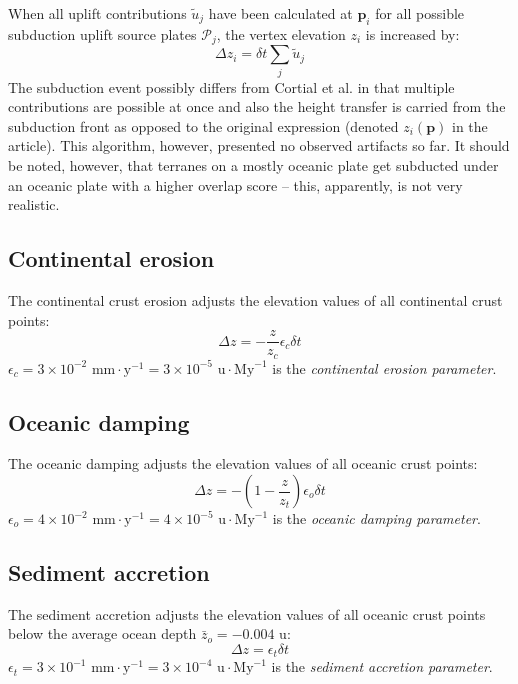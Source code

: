 When all uplift contributions $\tilde{u}_j$ have been calculated at $\mathbf{p}_i$ for all possible subduction uplift source plates $\mathcal{P}_j$, the vertex elevation $z_i$ is increased by:
$$\Delta z_i=\delta t\sum_j \tilde{u}_j$$
The subduction event possibly differs from Cortial et al. in that multiple contributions are possible at once and also the height transfer is carried from the subduction front as opposed to the original expression (denoted $z_i(\mathbf{p})$ in the article). This algorithm, however, presented no observed artifacts so far. It should be noted, however, that terranes on a mostly oceanic plate get subducted under an oceanic plate with a higher overlap score -- this, apparently, is not very realistic.
\subsection{Continental erosion}
The continental crust erosion adjusts the elevation values of all continental crust points:
$$\Delta z = -\frac{z}{z_c}\epsilon_c\delta t$$
$\epsilon_c=3\times10^{-2}\mbox{ mm}\cdot\mbox{y}^{-1}=3\times10^{-5}\mbox{ u}\cdot\mbox{My}^{-1}$ is the \textit{continental erosion parameter}.
\subsection{Oceanic damping}
The oceanic damping adjusts the elevation values of all oceanic crust points:
$$\Delta z = -\left(1-\frac{z}{z_t}\right)\epsilon_o\delta t$$
$\epsilon_o=4\times10^{-2}\mbox{ mm}\cdot\mbox{y}^{-1}=4\times10^{-5}\mbox{ u}\cdot\mbox{My}^{-1}$ is the \textit{oceanic damping parameter}.
\subsection{Sediment accretion}
The sediment accretion adjusts the elevation values of all oceanic crust points below the average ocean depth $\bar{z}_{o}=-0.004\mbox { u}$:
$$\Delta z = \epsilon_t\delta t$$
$\epsilon_t=3\times10^{-1}\mbox{ mm}\cdot\mbox{y}^{-1}=3\times10^{-4}\mbox{ u}\cdot\mbox{My}^{-1}$ is the \textit{sediment accretion parameter}.
